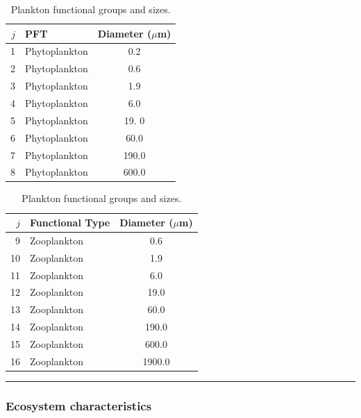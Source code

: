 \vspace{-0mm}
\begin{table}[htp!]
\begin{center}
\caption{Plankton functional groups and sizes.}
\begin{tabular}{rlc}
\hline
$j$     & PFT                   & \multicolumn{1}{r}{Diameter ($\mu$m)}  \\
\hline
1       & Phytoplankton         & 0.2  \\
2       & Phytoplankton         & 0.6  \\
3       & Phytoplankton         & 1.9  \\
4       & Phytoplankton         & 6.0  \\
5       & Phytoplankton         & 19. 0 \\
6       & Phytoplankton         & 60.0  \\
7       & Phytoplankton         & 190.0  \\
8       & Phytoplankton         & 600.0  \\
\hline
\end{tabular}
\begin{tabular}{rlc}
\hline
$j$     & Functional Type       & \multicolumn{1}{r}{Diameter ($\mu$m)}  \\
\hline
9       & Zooplankton           & 0.6  \\
10      & Zooplankton           & 1.9  \\
11      & Zooplankton           & 6.0  \\
12      & Zooplankton           & 19.0 \\
13      & Zooplankton           & 60.0  \\
14      & Zooplankton           & 190.0  \\
15      & Zooplankton           & 600.0  \\
16      & Zooplankton           & 1900.0  \\
\hline
\end{tabular}
\label{planktonconfig2}
\end{center}
\end{table}
\vspace{-6mm}

\vspace{1mm}
\noindent\rule{4cm}{0.1mm}

\subsubsection{Ecosystem characteristics}
\vspace{1mm}

